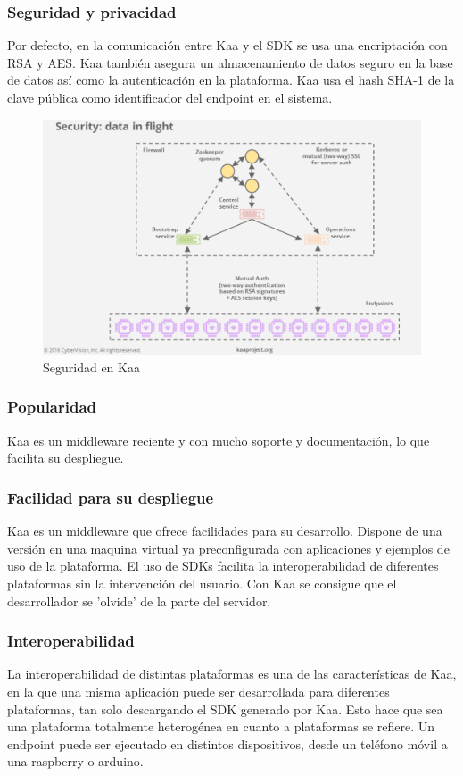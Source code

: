 \documentclass[12pt, twoside]{book}
\begin{document}
\subsubsection*{Seguridad y privacidad}
Por defecto, en la comunicación entre Kaa y el SDK se usa una encriptación con RSA y AES. Kaa también asegura un almacenamiento de datos seguro en la base de datos así como la autenticación en la plataforma. Kaa usa el hash SHA-1 de la clave pública como identificador del endpoint en el sistema.
\begin{figure}[H]
\centering
\includegraphics[scale=0.5]{images/security_capture}
\caption{Seguridad en Kaa}\label{L507}
\end{figure} 



\subsubsection*{Popularidad}
Kaa es un middleware reciente y con mucho soporte y documentación, lo que facilita su despliegue.
\subsubsection*{Facilidad para su despliegue} 
Kaa es un middleware que ofrece facilidades para su desarrollo. Dispone de una versión en una maquina virtual ya preconfigurada con aplicaciones y ejemplos de uso de la plataforma. El uso de SDKs facilita la interoperabilidad de diferentes plataformas sin la intervención del usuario. Con Kaa se consigue que el desarrollador se 'olvide' de la parte del servidor. 

\subsubsection*{Interoperabilidad}
La interoperabilidad de distintas plataformas es una de las características de Kaa, en la que una misma aplicación puede ser desarrollada para diferentes plataformas, tan solo descargando el SDK generado por Kaa. Esto hace que sea una plataforma totalmente heterogénea en cuanto a plataformas se refiere. Un endpoint puede ser ejecutado en distintos dispositivos, desde un teléfono móvil a una raspberry o arduino.
\end{document}
